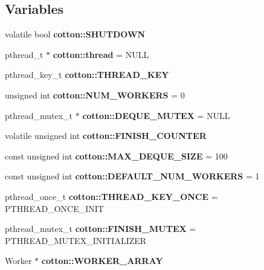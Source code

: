 \subsection*{Variables}
\begin{DoxyCompactItemize}
\item 
\mbox{\label{cotton-runtime_8h_ad72043de8ba79ff3385abd67fd1b15bf}} 
volatile bool {\bfseries cotton\+::\+S\+H\+U\+T\+D\+O\+WN}
\item 
\mbox{\label{cotton-runtime_8h_ae1c243496d4cac35fb6d8fb6be14b0f3}} 
pthread\+\_\+t $\ast$ {\bfseries cotton\+::thread} = N\+U\+LL
\item 
\mbox{\label{cotton-runtime_8h_a41bafde742c3ac2e3f360be9a8b2926d}} 
pthread\+\_\+key\+\_\+t {\bfseries cotton\+::\+T\+H\+R\+E\+A\+D\+\_\+\+K\+EY}
\item 
\mbox{\label{cotton-runtime_8h_a0d692d5b7c9fbd1d4999ed8270ebcce0}} 
unsigned int {\bfseries cotton\+::\+N\+U\+M\+\_\+\+W\+O\+R\+K\+E\+RS} = 0
\item 
\mbox{\label{cotton-runtime_8h_a71daeb136715fb167bda82ac84373091}} 
pthread\+\_\+mutex\+\_\+t $\ast$ {\bfseries cotton\+::\+D\+E\+Q\+U\+E\+\_\+\+M\+U\+T\+EX} = N\+U\+LL
\item 
\mbox{\label{cotton-runtime_8h_a8c3fa2e0febd6194c6c2e1b8274e3b6a}} 
volatile unsigned int {\bfseries cotton\+::\+F\+I\+N\+I\+S\+H\+\_\+\+C\+O\+U\+N\+T\+ER}
\item 
\mbox{\label{cotton-runtime_8h_abc469e68d18d644b538f6f16335fb5c4}} 
const unsigned int {\bfseries cotton\+::\+M\+A\+X\+\_\+\+D\+E\+Q\+U\+E\+\_\+\+S\+I\+ZE} = 100
\item 
\mbox{\label{cotton-runtime_8h_a261cb084089447eb9c2bab5c95891795}} 
const unsigned int {\bfseries cotton\+::\+D\+E\+F\+A\+U\+L\+T\+\_\+\+N\+U\+M\+\_\+\+W\+O\+R\+K\+E\+RS} = 1
\item 
\mbox{\label{cotton-runtime_8h_a49aaf0b0bc093f68bcc20907ff338827}} 
pthread\+\_\+once\+\_\+t {\bfseries cotton\+::\+T\+H\+R\+E\+A\+D\+\_\+\+K\+E\+Y\+\_\+\+O\+N\+CE} = P\+T\+H\+R\+E\+A\+D\+\_\+\+O\+N\+C\+E\+\_\+\+I\+N\+IT
\item 
\mbox{\label{cotton-runtime_8h_a0fa66e316877ba57e881d9c4fd193765}} 
pthread\+\_\+mutex\+\_\+t {\bfseries cotton\+::\+F\+I\+N\+I\+S\+H\+\_\+\+M\+U\+T\+EX} = P\+T\+H\+R\+E\+A\+D\+\_\+\+M\+U\+T\+E\+X\+\_\+\+I\+N\+I\+T\+I\+A\+L\+I\+Z\+ER
\item 
\mbox{\label{cotton-runtime_8h_a90bfbca05b124b3b7e18e43d3354ae4e}} 
Worker $\ast$ {\bfseries cotton\+::\+W\+O\+R\+K\+E\+R\+\_\+\+A\+R\+R\+AY}
\end{DoxyCompactItemize}



